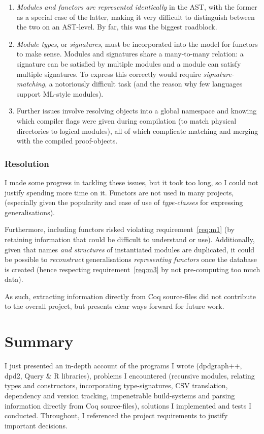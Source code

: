 \begin{enumerate}

  \item \emph{Modules and functors are represented identically} in the AST, with
    the former as a special case of the latter, making it very difficult to
    distinguish between the two on an AST-level. By far, this was the biggest
    roadblock.

  \item \emph{Module types}, or \emph{signatures}, must be incorporated into
    the model for functors to make sense. Modules and signatures share a
    many-to-many relation: a signature can be satisfied by multiple modules
    and a module can satisfy multiple signatures. To express this correctly
    would require \emph{signature-matching}, a notoriously difficult task (and
    the reason why few languages support ML-style modules).

  \item Further issues involve resolving objects into a global namespace and
    knowing which compiler flags were given during compilation (to match
    physical directories to logical modules), all of which complicate matching
    and merging with the compiled proof-objects.

\end{enumerate}

\subsubsection{Resolution}

I made some progress in tackling these issues, but it took too long, so I could
not justify spending more time on it. Functors are not used in many projects,
(especially given the popularity and ease of use of \emph{type-classes} for
expressing generalisations). 

Furthermore, including functors risked violating requirement~\ref{req:m1} (by
retaining information that could be difficult to understand or use).
Additionally, given that names \emph{and structures} of instantiated modules are
duplicated, it could be possible to \emph{reconstruct} generalisations
\emph{representing functors} once the database is created (hence respecting
requirement~\ref{req:m3} by not pre-computing too much data).

As such, extracting information directly from Coq source-files did not
contribute to the overall project, but presents clear ways forward for future
work.

\section{Summary}

I just presented an in-depth account of the programs I wrote (dpdgraph++, dpd2,
Query \& R libraries), problems I encountered (recursive modules, relating types
and constructors, incorporating type-signatures, CSV translation, dependency and
version tracking, impenetrable build-systems and parsing information directly
from Coq source-files), solutions I implemented and tests I conducted.
Throughout, I referenced the project requirements to justify important
decisions.
